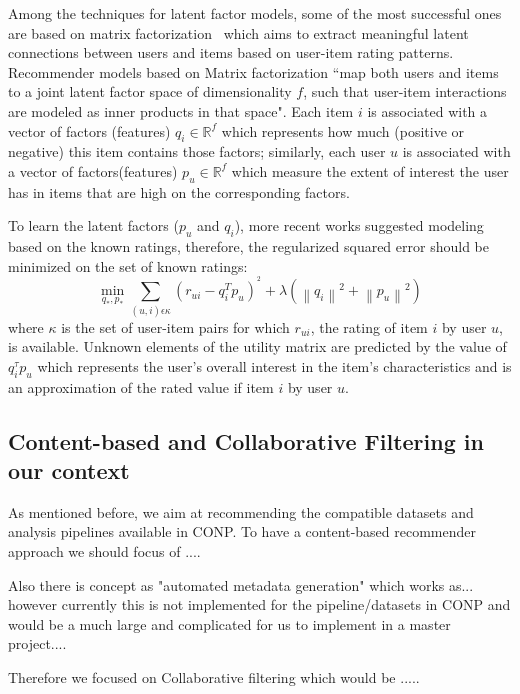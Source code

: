 Among the techniques for latent factor models, some of the most successful ones are based on matrix factorization~\cite{koren2009matrix} which aims to extract meaningful latent connections between users and items based on user-item rating patterns. Recommender models based on Matrix factorization ``map both users and items to a joint latent factor space of dimensionality $f$, such that user-item interactions are modeled as inner products in that space". Each item $i$ is associated with a vector of factors (features) 
$q_{i}\in \mathbb{R}^{f}$
which represents how much (positive or negative) this item contains those factors; similarly, each user $u$ is associated with a vector of factors(features) 
$p_{u}\in \mathbb{R}^{f}$
which measure the extent of interest the user has in items that are high on the corresponding factors. 


To learn the latent factors ($p_{u}$ and $q_{i}$), more recent works suggested modeling based on the known ratings, therefore, the regularized squared error should be minimized on the set of 
known ratings:
\begin{equation} \tag{1}
   \min_{q_{*},p_{*}} \sum_{(u,i) \epsilon \kappa }  (r_{ui}-q_{i}^{T}p_{u})^{^2}+\lambda \left ( \left \| q_{i}\right \|^2+\left \| p_{u}\right \|^2 \right )            \label{equation}
\end{equation}
where $\kappa$ is the set of user-item pairs for which $r_{ui}$, the rating of item $i$ by user $u$, is available. Unknown elements of the utility matrix are predicted by the value of $q_{i}^{\tau }p_{u}$ which represents the user’s overall interest in the item’s characteristics and is an approximation of the rated value if item $i$ by user $u$. 


\subsection{Content-based and Collaborative Filtering in our context}

As mentioned before, we aim at recommending the compatible datasets and analysis pipelines available in CONP. To have a content-based recommender approach we should focus of ....

Also there is concept as "automated metadata generation" which works as... however currently this is not implemented for the pipeline/datasets in CONP and would be a much large and complicated for us to implement in a master project....

Therefore we focused on Collaborative filtering which would be .....
